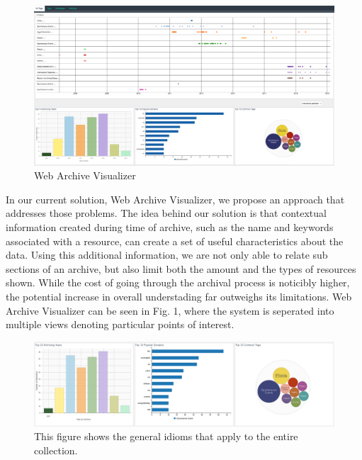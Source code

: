 \documentclass[10pt,journal,compsoc]{IEEEtran}
\begin{document}
\begin{figure}[t]
\centering
\includegraphics[scale=0.1]{Figure1}
\caption{Web Archive Visualizer}
\label{fig:mesh1}
\end{figure}

In our current solution, Web Archive Visualizer, we propose an approach that addresses those problems. The idea behind our solution is that contextual information created during time of archive, such as the name and keywords associated with a resource, can create a set of useful characteristics about the data. Using this additional information, we are not only able to relate sub sections of an archive, but also limit both the amount and the types of resources shown. While the cost of going through the archival process is noticibly higher, the potential increase in overall understading far outweighs its limitations. Web Archive Visualizer can be seen in Fig. 1, where the system is seperated into multiple views denoting particular points of interest. \par

\begin{figure}
\centering
\includegraphics[width=\textwidth]{Figure3a}
\caption{This figure shows the general idioms that apply to the entire collection.}
\label{fig:mesh2}
\end{figure}
\end{document}
